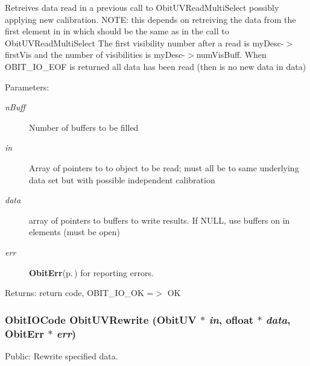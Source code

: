 Retreives data read in a previous call to Obit\-UVRead\-Multi\-Select possibly applying new calibration. NOTE: this depends on retreiving the data from the first element in in which should be the same as in the call to Obit\-UVRead\-Multi\-Select The first visibility number after a read is my\-Desc-$>$first\-Vis and the number of visibilities is my\-Desc-$>$num\-Vis\-Buff. When OBIT\_\-IO\_\-EOF is returned all data has been read (then is no new data in data) \begin{Desc}
\item[Parameters:]
\begin{description}
\item[{\em n\-Buff}]Number of buffers to be filled \item[{\em in}]Array of pointers to to object to be read; must all be to same underlying data set but with possible independent calibration \item[{\em data}]array of pointers to buffers to write results. If NULL, use buffers on in elements (must be open) \item[{\em err}]{\bf Obit\-Err}{\rm (p.\,\pageref{structObitErr})} for reporting errors. \end{description}
\end{Desc}
\begin{Desc}
\item[Returns:]return code, OBIT\_\-IO\_\-OK =$>$ OK \end{Desc}
\subsubsection{\setlength{\rightskip}{0pt plus 5cm}Obit\-IOCode Obit\-UVRewrite ({\bf Obit\-UV} $\ast$ {\em in}, {\bf ofloat} $\ast$ {\em data}, {\bf Obit\-Err} $\ast$ {\em err})}\label{ObitUV_8c_a29}


Public: Rewrite specified data. 

